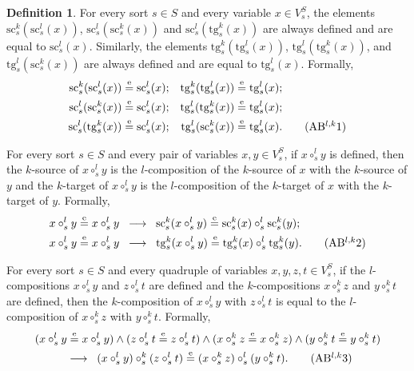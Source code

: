 \documentclass[a4paper, reqno]{amsbook}
\newcommand{\eeq}{\overset{\mathrm e}{=}}      %
\newcommand{\src}{\mathrm{sc}}
\newcommand{\tgt}{\mathrm{tg}}
\theoremstyle{plain}
\theoremstyle{definition}
\newtheorem{definition}[theorem]{Definition}
\begin{document}
\begin{definition}
For every sort $s\in S$ and every variable $x\in V^{S}_{s}$, the elements $\src^{k}_{s}(\src^{l}_{s}(x))$, $\src^{l}_{s}(\src^{k}_{s}(x))$ and $\src^{l}_{s}(\tgt^{k}_{s}(x))$ are always defined and are equal to $\src^{l}_{s}(x)$.
Similarly, the elements $\tgt^{k}_{s}(\tgt^{l}_{s}(x))$, $\tgt^{l}_{s}(\tgt^{k}_{s}(x))$, and $\tgt^{l}_{s}(\src^{k}_{s}(x))$ are always defined and are equal to $\tgt^{l}_{s}(x)$.
Formally,
\begin{align*}
\src^{k}_{s}(\src^{l}_{s}(x))&\eeq\src^{l}_{s}(x);
&
\tgt^{k}_{s}(\tgt^{l}_{s}(x))&\eeq\tgt^{l}_{s}(x);\\
\src^{l}_{s}(\src^{k}_{s}(x))&\eeq\src^{l}_{s}(x);
&
\tgt^{l}_{s}(\tgt^{k}_{s}(x))&\eeq\tgt^{l}_{s}(x);\\
\src^{l}_{s}(\tgt^{k}_{s}(x))&\eeq\src^{l}_{s}(x);
&
\tgt^{l}_{s}(\src^{k}_{s}(x))&\eeq\tgt^{l}_{s}(x).\label{ACatABlk1}\tag{AB$^{l,k}$1}
\end{align*}

For every sort $s\in S$ and every pair of variables $x,y\in V^{S}_{s}$, if $x\circ^{l}_{s}y$ is defined, then the $k$-source of $x\circ^{l}_{s}y$ is the $l$-composition of the $k$-source of $x$ with the $k$-source of $y$ and the $k$-target of $x\circ^{l}_{s}y$ is the $l$-composition of the $k$-target of $x$ with the $k$-target of $y$.
Formally,
\begin{align*}
x\circ^{l}_{s}y&\eeq x\circ^{l}_{s}y \;\;\longrightarrow\;\;
\src^{k}_{s}(x\circ^{l}_{s}y)\eeq\src^{k}_{s}(x)\circ^{l}_{s}\src^{k}_{s}(y);\\
x\circ^{l}_{s}y&\eeq x\circ^{l}_{s}y \;\;\longrightarrow\;\;
\tgt^{k}_{s}(x\circ^{l}_{s}y)\eeq\tgt^{k}_{s}(x)\circ^{l}_{s}\tgt^{k}_{s}(y).
\label{ACatABlk2}\tag{AB$^{l,k}$2}
\end{align*}

For every sort $s\in S$ and every quadruple of variables $x,y,z,t\in V^{S}_{s}$, if the $l$-compositions $x\circ^{l}_{s}y$ and $z\circ^{l}_{s}t$ are defined and the $k$-compositions $x\circ^{k}_{s}z$ and $y\circ^{k}_{s}t$ are defined, then the $k$-composition of $x\circ^{l}_{s}y$ with $z\circ^{l}_{s}t$ is equal to the $l$-composition of $x\circ^{k}_{s}z$ with $y\circ^{k}_{s}t$.
Formally,
\begin{multline*}
(x\circ^{l}_{s}y\eeq x\circ^{l}_{s}y)
\wedge
(z\circ^{l}_{s}t\eeq z\circ^{l}_{s}t)
\wedge
(x\circ^{k}_{s}z\eeq x\circ^{k}_{s}z)
\wedge
(y\circ^{k}_{s}t\eeq y\circ^{k}_{s}t)
\\
\;\;\longrightarrow\;\;
(x\circ^{l}_{s}y)\circ^{k}_{s}(z\circ^{l}_{s}t)\eeq
(x\circ^{k}_{s}z)\circ^{l}_{s}(y\circ^{k}_{s}t).
\label{ACatABlk3}\tag{AB$^{l,k}$3}
\end{multline*}


\end{definition}
\end{document}
